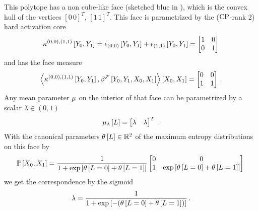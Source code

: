 \begin{example}
    This polytope has a non cube-like face (sketched blue in ), which is the convex hull of the vertices $[0 \, 0]^T, \, [1 \, 1]^T$.
    This face is parametrized by the ($\mathrm{CP}$-rank 2) hard activation core
    \begin{align*}
        \kappa^{(0,0),(1,1)}\left[Y_{0},Y_{1}\right] =
        \epsilon_{(0,0)}\left[Y_{0},Y_{1}\right] + \epsilon_{(1,1)}\left[Y_{0},Y_{1}\right] =
        \begin{bmatrix}
            1 & 0 \\
            0 & 1
        \end{bmatrix}
    \end{align*}
    and has the face measure
    \begin{align*}
        \left\langle \kappa^{(0,0),(1,1)}\left[Y_{0},Y_{1}\right]
            ,\beta^{\mathcal{F}}\left[Y_{0},Y_{1},X_{0},X_{1}\right]\right\rangle \left[ X_{0},X_{1} \right]
        =   \begin{bmatrix}
                0 & 0 \\
                1 & 1
        \end{bmatrix} \, .
    \end{align*}
    Any mean parameter $\mu$ on the interior of that face can be parametrized by a scalar $\lambda\in(0,1)$
    \begin{align*}
        \mu_{\lambda}\left[L\right] = \begin{bmatrix}
                                                    \lambda & \lambda
        \end{bmatrix}^T \, .
    \end{align*}
    With the canonical parameters $\theta\left[L\right]\in\mathbb{R}^2$ of the maximum entropy distributions on this face by
    \begin{align*}
        \mathbb{P}\left[X_{0},X_{1}\right] =
        \frac{1}{1+\mathrm{exp}\left[\theta\left[L=0\right]+\theta\left[L=1\right]\right]}
        \begin{bmatrix}
            0 & 0                                                               \\
            1 & \mathrm{exp}\left[\theta\left[L=0\right]+\theta\left[L=1\right]\right] \\
        \end{bmatrix} \,
    \end{align*}
    we get the correspondence by the sigmoid
    \begin{align*}
        \lambda = \frac{1}{1+\mathrm{exp}\left[-(\theta\left[L=0\right]+\theta\left[L=1\right])\right]} \, .
    \end{align*}


\end{example}
